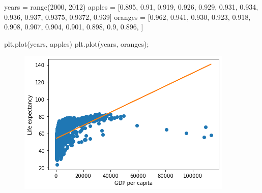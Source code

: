 \documentclass[
  letterpaper,
  DIV=11,
  numbers=noendperiod]{scrreprt}
\newenvironment{Shaded}{\begin{snugshade}}{\end{snugshade}}
\newcommand{\BuiltInTok}[1]{\textcolor[rgb]{0.00,0.23,0.31}{#1}}
\newcommand{\DecValTok}[1]{\textcolor[rgb]{0.68,0.00,0.00}{#1}}
\newcommand{\FloatTok}[1]{\textcolor[rgb]{0.68,0.00,0.00}{#1}}
\newcommand{\NormalTok}[1]{\textcolor[rgb]{0.00,0.23,0.31}{#1}}
\newcommand{\OperatorTok}[1]{\textcolor[rgb]{0.37,0.37,0.37}{#1}}
\begin{document}
\begin{Shaded}
\begin{Highlighting}[]
\NormalTok{years }\OperatorTok{=} \BuiltInTok{range}\NormalTok{(}\DecValTok{2000}\NormalTok{, }\DecValTok{2012}\NormalTok{)}
\NormalTok{apples }\OperatorTok{=}\NormalTok{ [}\FloatTok{0.895}\NormalTok{, }\FloatTok{0.91}\NormalTok{, }\FloatTok{0.919}\NormalTok{, }\FloatTok{0.926}\NormalTok{, }\FloatTok{0.929}\NormalTok{, }\FloatTok{0.931}\NormalTok{, }\FloatTok{0.934}\NormalTok{, }\FloatTok{0.936}\NormalTok{, }\FloatTok{0.937}\NormalTok{, }\FloatTok{0.9375}\NormalTok{, }\FloatTok{0.9372}\NormalTok{, }\FloatTok{0.939}\NormalTok{]}
\NormalTok{oranges }\OperatorTok{=}\NormalTok{ [}\FloatTok{0.962}\NormalTok{, }\FloatTok{0.941}\NormalTok{, }\FloatTok{0.930}\NormalTok{, }\FloatTok{0.923}\NormalTok{, }\FloatTok{0.918}\NormalTok{, }\FloatTok{0.908}\NormalTok{, }\FloatTok{0.907}\NormalTok{, }\FloatTok{0.904}\NormalTok{, }\FloatTok{0.901}\NormalTok{, }\FloatTok{0.898}\NormalTok{, }\FloatTok{0.9}\NormalTok{, }\FloatTok{0.896}\NormalTok{, ]}
\end{Highlighting}
\end{Shaded}

\begin{Shaded}
\begin{Highlighting}[]
\NormalTok{plt.plot(years, apples)}
\NormalTok{plt.plot(years, oranges)}\OperatorTok{;}
\end{Highlighting}
\end{Shaded}

\begin{figure}[H]

{\centering \includegraphics{Data visualization_files/figure-pdf/cell-10-output-1.png}

}

\end{figure}
\end{document}
